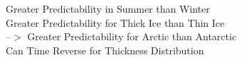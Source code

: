 \textwidth=6.5in
\oddsidemargin=-0.5in
\renewcommand{\baselinestretch}{2.0}

\begin{center}

\LARGE{Greater Predictability in Summer than Winter}\\
\LARGE{Greater Predictability for Thick Ice than Thin Ice} \\
\LARGE{--$>$ Greater Predictability for Arctic than Antarctic} \\
\LARGE{Can Time Reverse for Thickness Distribution} 

\end{center}


